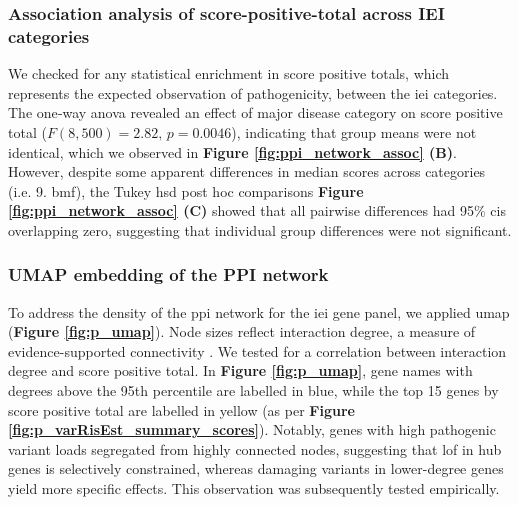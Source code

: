 \FloatBarrier
\subsubsection{Association analysis of score-positive-total across IEI categories} 

We checked for any statistical enrichment in score positive totals, which represents the expected observation of pathogenicity, between the \ac{iei} categories.
The one‐way \ac{anova} revealed an effect of major disease category on score positive total (\(F(8,500)=2.82,\,p=0.0046\)), indicating that group means were not identical, which we observed in
\textbf{Figure \ref{fig:ppi_network_assoc} (B)}.
However, despite some apparent differences in median scores across categories (i.e. 9. \ac{bmf}), the Tukey \ac{hsd} post hoc comparisons 
\textbf{Figure \ref{fig:ppi_network_assoc} (C)}
showed that all pairwise differences had 95\% \ac{ci}s overlapping zero, suggesting that individual group differences were not significant.

\FloatBarrier
\subsubsection{UMAP embedding of the PPI  network}
To address the density of the \ac{ppi} network for the \ac{iei} gene panel, we applied \ac{umap} (\textbf{Figure \ref{fig:p_umap}}). 
Node sizes reflect interaction degree, a measure of evidence-supported connectivity \cite{szklarczyk2025string}. We tested for a correlation between interaction degree and score positive total. In \textbf{Figure \ref{fig:p_umap}}, gene names with degrees above the 95th percentile are labelled in blue, while the top 15 genes by score positive total are labelled in yellow (as per \textbf{Figure \ref{fig:p_varRisEst_summary_scores}}). Notably, genes with high pathogenic variant loads segregated from highly connected nodes, suggesting that \ac{lof} in hub genes is selectively constrained, whereas damaging variants in lower-degree genes yield more specific effects. This observation was subsequently tested empirically.

